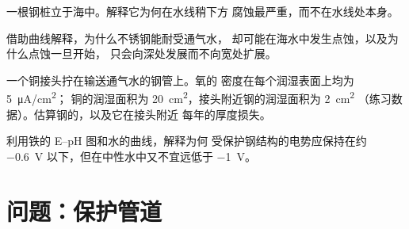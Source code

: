 \begin{exercise}[$\star\star$]\label{exo:b2:corrosion:9}
一根钢桩立于海中。解释它为何在水线稍下方
腐蚀最严重，而不在水线处本身。
\end{exercise}

\begin{exercise}[$\star\star\star$]\label{exo:b2:corrosion:10}
借助曲线解释，为什么不锈钢能耐受通气水，
却可能在海水中发生点蚀，以及为什么点蚀一旦开始，
只会向深处发展而不向宽处扩展。
\end{exercise}

\begin{exercise}[$\star\star\star$]\label{exo:b2:corrosion:11}
一个铜接头拧在输送通气水的钢管上。氧的
密度在每个润湿表面上均为 \qty{5}{\micro A/cm^2}；
铜的润湿面积为 \qty{20}{cm^2}，接头附近钢的润湿面积为 \qty{2}{cm^2}
（练习数据）。估算钢的，以及它在接头附近
每年的厚度损失。
\end{exercise}

\begin{exercise}[$\star\star\star$]\label{exo:b2:corrosion:12}
利用铁的 E--pH 图和水的曲线，解释为何
受保护钢结构的电势应保持在约
\qty{-0.6}{V} 以下，但在中性水中又不宜远低于 \qty{-1}{V}。
\end{exercise}

\section{问题：保护管道}

